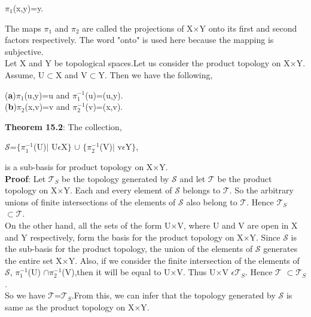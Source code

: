 \documentclass[a4paper,english,12pt]{article}
\begin{document}
\begin{flushleft}
\begin{center}
$\pi_1$(x,y)=y. \\
\end{center}
The maps $\pi_1$ and $\pi_2$ are called the projections of X$\times$Y onto its first and second factors respectively. The word "onto" is used here because the mapping is subjective.\\
Let X and Y be topological spaces.Let us consider the product topology on X$\times$Y. Assume, U$\subset$X and V$\subset$Y. Then we have the following,\\
\begin{center}
({\bf a})$\pi_1$(u,y)=u and $\pi^{-1}_1$(u)=(u,y).\\
({\bf b})$\pi_2$(x,v)=v and $\pi^{-1}_2$(v)=(x,v).\\
\end{center}
{\bf Theorem 15.2}: The collection,
\begin{center}
$\mathscr{S}$=$\{\pi^{-1}_1$(U)$\mid$ U$\epsilon$X$\}$ $\cup$ $\{\pi^{-1}_2$(V)$\mid$ v$\epsilon$Y$\}$,\\
\end{center}
is a sub-basis for product topology on X$\times$Y.\\
{\bf Proof}: Let $\mathscr{T}_S$ be the topology generated by $\mathscr{S}$ and let $\mathscr{T}$  be the product topology on X$\times$Y. Each and every element of $\mathscr{S}$ belongs to $\mathscr{T}$. So the arbitrary unions of finite intersections of the elements of $\mathscr{S}$ also belong to $\mathscr{T}$. Hence $\mathscr{T}_S$ $\subset \mathscr{T}$.\\
On the other hand, all the sets of the form U$\times$V, where U and V are open in X and Y respectively, form the basis for the product topology on X$\times$Y. Since $\mathscr{S}$ is the sub-basis for the product topology, the union of the elements of $\mathscr{S}$ generates the entire set X$\times$Y. Also, if we consider the finite intersection of the elements of $\mathscr{S}$, $\pi^{-1}_1$(U) $\cap \pi^{-1}_2$(V),then it will be equal to U$\times$V. Thus U$\times$V $\epsilon \mathscr{T}_S$. Hence $\mathscr{T}$ $\subset \mathscr{T}_S$.\\
So we have $\mathscr{T}$=$\mathscr{T}_S$.From this, we can infer that the topology generated by $\mathscr{S}$ is same as the product topology on X$\times$Y.

\end{flushleft}
\end{document}
